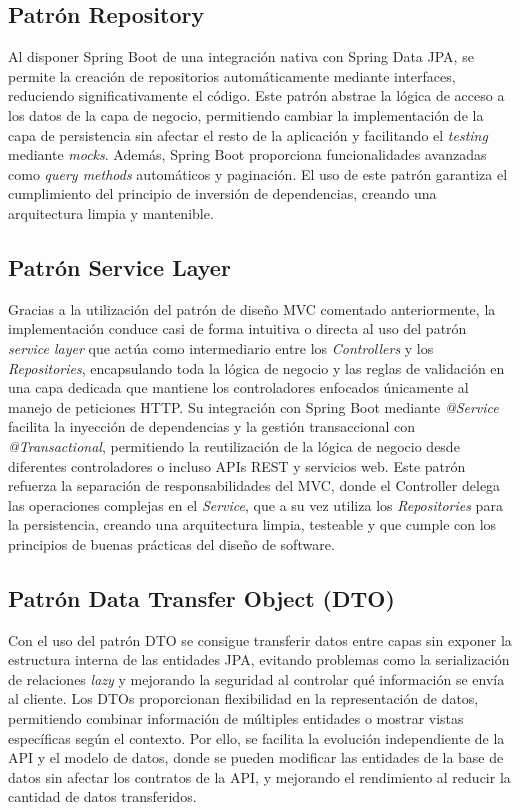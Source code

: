 \subsection{Patrón Repository}\label{patron-repository}
Al disponer Spring Boot de una integración nativa con Spring Data JPA, se permite la creación de repositorios automáticamente mediante interfaces, reduciendo significativamente el código. Este patrón abstrae la lógica de acceso a los datos de la capa de negocio, permitiendo cambiar la implementación de la capa de persistencia sin afectar el resto de la aplicación y facilitando el \emph{testing} mediante \emph{mocks}. Además, Spring Boot proporciona funcionalidades avanzadas como \emph{query methods} automáticos y paginación. El uso de este patrón garantiza el cumplimiento del principio de inversión de dependencias, creando una arquitectura limpia y mantenible.

\subsection{Patrón Service Layer}\label{patron-service-layer}
Gracias a la utilización del patrón de diseño MVC comentado anteriormente, la implementación conduce casi de forma intuitiva o directa al uso del patrón \emph{service layer} que actúa como intermediario entre los \emph{Controllers} y los \emph{Repositories}, encapsulando toda la lógica de negocio y las reglas de validación en una capa dedicada que mantiene los controladores enfocados únicamente al manejo de peticiones HTTP. Su integración con Spring Boot mediante \emph{@Service} facilita la inyección de dependencias y la gestión transaccional con \emph{@Transactional}, permitiendo la reutilización de la lógica de negocio desde diferentes controladores o incluso APIs REST y servicios web. Este patrón refuerza la separación de responsabilidades del MVC, donde el Controller delega las operaciones complejas en el \emph{Service}, que a su vez utiliza los \emph{Repositories} para la persistencia, creando una arquitectura limpia, testeable y que cumple con los principios de buenas prácticas del diseño de software.

\subsection{Patrón Data Transfer Object (DTO)}\label{patron-data-transfer-object}
Con el uso del patrón DTO se consigue transferir datos entre capas sin exponer la estructura interna de las entidades JPA, evitando problemas como la serialización de relaciones \emph{lazy} y mejorando la seguridad al controlar qué información se envía al cliente. Los DTOs proporcionan flexibilidad en la representación de datos, permitiendo combinar información de múltiples entidades o mostrar vistas específicas según el contexto. Por ello, se facilita la evolución independiente de la API y el modelo de datos, donde se pueden modificar las entidades de la base de datos sin afectar los contratos de la API, y mejorando el rendimiento al reducir la cantidad de datos transferidos.
